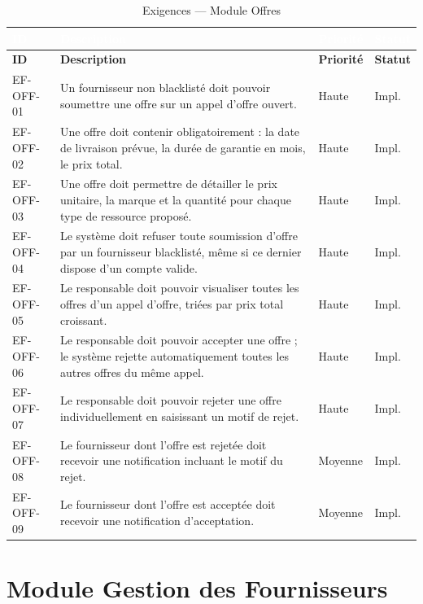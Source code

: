 \documentclass[12pt,a4paper]{report}
\begin{document}
\begin{longtable}{|C{1.8cm}|L{8.5cm}|C{2cm}|C{2cm}|}
\caption{Exigences — Module Offres} \\
\hline
{}\textcolor{white}{\textbf{ID}} & \textcolor{white}{\textbf{Description}} & \textcolor{white}{\textbf{Priorité}} & \textcolor{white}{\textbf{Statut}} \\
\hline
\endfirsthead
\hline
\textbf{ID} & \textbf{Description} & \textbf{Priorité} & \textbf{Statut} \\
\hline
\endhead
EF-OFF-01 & Un fournisseur non blacklisté doit pouvoir soumettre une offre sur un appel d'offre ouvert. & Haute & Impl. \\
\hline
EF-OFF-02 & Une offre doit contenir obligatoirement : la date de livraison prévue, la durée de garantie en mois, le prix total. & Haute & Impl. \\
\hline
EF-OFF-03 & Une offre doit permettre de détailler le prix unitaire, la marque et la quantité pour chaque type de ressource proposé. & Haute & Impl. \\
\hline
EF-OFF-04 & Le système doit refuser toute soumission d'offre par un fournisseur blacklisté, même si ce dernier dispose d'un compte valide. & Haute & Impl. \\
\hline
EF-OFF-05 & Le responsable doit pouvoir visualiser toutes les offres d'un appel d'offre, triées par prix total croissant. & Haute & Impl. \\
\hline
EF-OFF-06 & Le responsable doit pouvoir accepter une offre ; le système rejette automatiquement toutes les autres offres du même appel. & Haute & Impl. \\
\hline
EF-OFF-07 & Le responsable doit pouvoir rejeter une offre individuellement en saisissant un motif de rejet. & Haute & Impl. \\
\hline
EF-OFF-08 & Le fournisseur dont l'offre est rejetée doit recevoir une notification incluant le motif du rejet. & Moyenne & Impl. \\
\hline
EF-OFF-09 & Le fournisseur dont l'offre est acceptée doit recevoir une notification d'acceptation. & Moyenne & Impl. \\
\hline
\end{longtable}

\section{Module Gestion des Fournisseurs}
\end{document}

